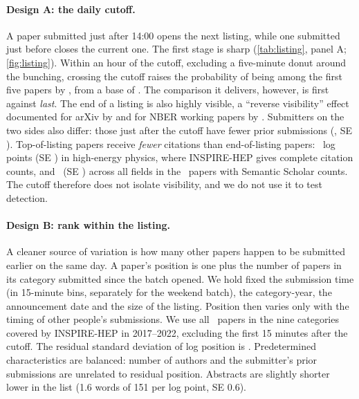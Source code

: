 \paragraph{Design A: the daily cutoff.} A paper submitted just after 14:00 opens
the next listing, while one submitted just before closes the current one. The
first stage is sharp (\cref{tab:listing}, panel A; \cref{fig:listing}). Within an
hour of the cutoff, excluding a five-minute donut around the bunching, crossing
the cutoff raises the probability of being among the first five papers by
\empRDtopfive, from a base of \empRDtopfiveBefore. The comparison it delivers,
however, is first against \emph{last}. The end of a listing is also highly
visible, a ``reverse visibility'' effect documented for arXiv by
\citet{haqueginsparg2010} and for NBER working papers by
\citet{feenbergetal2017}. Submitters on the two sides also differ: those just
after the cutoff have fewer prior submissions (\empRDprior, SE \empRDpriorSE). Top-of-listing papers receive \emph{fewer} citations
than end-of-listing papers: \empRDcitesIns\ log points (SE \empRDcitesInsSE) in
high-energy physics, where INSPIRE-HEP gives complete citation counts, and
\empRDcitesSS\ (SE \empRDcitesSSSE) across all fields in the
\empRDcitesSSN\ papers with Semantic Scholar counts. The cutoff therefore does not isolate
visibility, and we do not use it to test detection.

\paragraph{Design B: rank within the listing.} A cleaner source of variation is
how many other papers happen to be submitted earlier on the same day. A
paper's position is one plus the number of papers in its category submitted
since the batch opened. We hold fixed the submission time (in 15-minute bins,
separately for the weekend batch), the category-year, the announcement date
and the size of the listing. Position then varies only with the timing of
other people's submissions. We use all \empRankN\ papers in the nine
categories covered by INSPIRE-HEP in 2017--2022, excluding the first 15 minutes
after the cutoff. The residual standard deviation of log position is
\empRankSD. Predetermined characteristics are balanced: number of authors and
the submitter's prior submissions are unrelated to residual position.
Abstracts are slightly shorter lower in the list (1.6 words of 151 per log point, SE 0.6).

